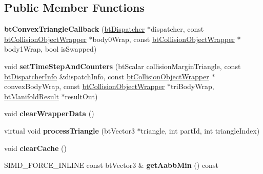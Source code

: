 \subsection*{Public Member Functions}
\begin{DoxyCompactItemize}
\item 
\mbox{\label{classbtConvexTriangleCallback_a6f4ecb0523e0400fa311a166ef44d615}} 
{\bfseries bt\+Convex\+Triangle\+Callback} (\hyperlink{classbtDispatcher}{bt\+Dispatcher} $\ast$dispatcher, const \hyperlink{structbtCollisionObjectWrapper}{bt\+Collision\+Object\+Wrapper} $\ast$body0\+Wrap, const \hyperlink{structbtCollisionObjectWrapper}{bt\+Collision\+Object\+Wrapper} $\ast$body1\+Wrap, bool is\+Swapped)
\item 
\mbox{\label{classbtConvexTriangleCallback_aa1deb837a2ff8a42f7f26f49194879ae}} 
void {\bfseries set\+Time\+Step\+And\+Counters} (bt\+Scalar collision\+Margin\+Triangle, const \hyperlink{structbtDispatcherInfo}{bt\+Dispatcher\+Info} \&dispatch\+Info, const \hyperlink{structbtCollisionObjectWrapper}{bt\+Collision\+Object\+Wrapper} $\ast$convex\+Body\+Wrap, const \hyperlink{structbtCollisionObjectWrapper}{bt\+Collision\+Object\+Wrapper} $\ast$tri\+Body\+Wrap, \hyperlink{classbtManifoldResult}{bt\+Manifold\+Result} $\ast$result\+Out)
\item 
\mbox{\label{classbtConvexTriangleCallback_ae89fd9d19380ccb4c9d76607027345dd}} 
void {\bfseries clear\+Wrapper\+Data} ()
\item 
\mbox{\label{classbtConvexTriangleCallback_a876455c6c0e579ab602d34790ce79260}} 
virtual void {\bfseries process\+Triangle} (bt\+Vector3 $\ast$triangle, int part\+Id, int triangle\+Index)
\item 
\mbox{\label{classbtConvexTriangleCallback_a881f3c19fa5af5a2bc2aa298c7b18d25}} 
void {\bfseries clear\+Cache} ()
\item 
\mbox{\label{classbtConvexTriangleCallback_a22e53c06500c04617b3a7b452f4af853}} 
S\+I\+M\+D\+\_\+\+F\+O\+R\+C\+E\+\_\+\+I\+N\+L\+I\+NE const bt\+Vector3 \& {\bfseries get\+Aabb\+Min} () const
\item 

\end{DoxyCompactItemize}
